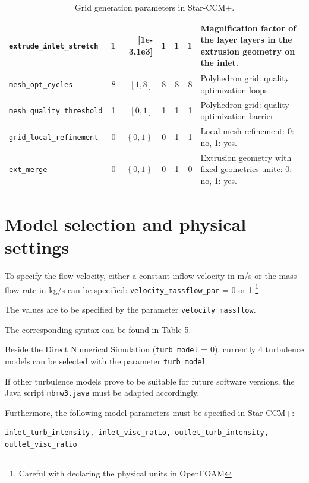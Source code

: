 \documentclass[a4paper,oneside]{book}
\numberwithin{equation}{section}
\begin{document}
\begin{table}[!htbp]
\begin{tabular}{|l|r|r|r|r|r|p{5cm}|}
        \hline 
        \verb|extrude_inlet_stretch| & 1 & [1e-3,1e3] & 1 & 1 & 1 & Magnification factor of the layer layers
        in the extrusion geometry on the inlet. \\ 
        \hline 
        \verb|mesh_opt_cycles| & 8 & $\left[1,8\right]$ & 8 & 8 & 8 & Polyhedron grid: quality optimization loops. \\ 
        \hline 
        \verb|mesh_quality_threshold| & 1 & $\left[0,1\right]$ & 1 & 1 & 1 & Polyhedron grid: quality optimization barrier. \\ 
        \hline 
        \verb|grid_local_refinement| & 0 & $\left\{0,1\right\}$ & 0 & 1 & 1 & Local mesh refinement: 0: no, 1: yes. \\ 
        \hline 
        \verb|ext_merge| & 0 & $\left\{0,1\right\}$ & 0 & 1 & 0 & Extrusion geometry with fixed geometries
        unite: 0: no, 1: yes. \\ 
        \hline 
    \end{tabular}
    \caption{Grid generation parameters in  Star-CCM+.}
\end{table}

\section{Model selection and physical settings}
To specify the flow velocity, either a constant inflow velocity in m/s or the mass flow rate in kg/s can be specified: \verb|velocity_massflow_par| = 0 or 1.\footnote{Careful with declaring the physical units in OpenFOAM}

The values are to be specified by the parameter \verb|velocity_massflow|.

The corresponding syntax can be found in Table 5.

Beside the Direct Numerical Simulation (\verb|turb_model| = 0), currently 4 turbulence models can be selected with the parameter \verb|turb_model|.

If other turbulence models prove to be suitable for future software versions, the Java script \texttt{mbmw3.java} must be adapted accordingly.

Furthermore, the following model parameters must be specified in  Star-CCM+:
\begin{verbatim}
inlet_turb_intensity, inlet_visc_ratio, outlet_turb_intensity, outlet_visc_ratio
\end{verbatim}
\end{document}
